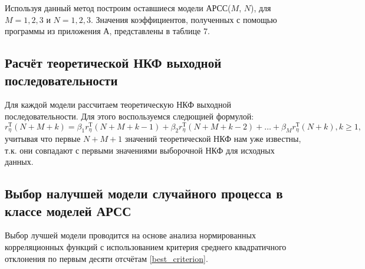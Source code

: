 \documentclass[12pt, fleqn]{article}
\begin{document}
{{{					Используя данный метод построим оставшиеся модели АРСС($M$, $N$), для $M = 1, 2, 3$ и $N = 1, 2, 3$. Значения коэффициентов, полученных с помощью программы из приложения А, представлены в таблице 7.
		}
		\subsection{Расчёт теоретической НКФ выходной последовательности} {
			Для каждой модели рассчитаем теоретическую НКФ выходной последовательности. Для этого воспользуемся следющией формулой:
			\begin{equation}
				r_\eta^\text{Т}(N + M + k) = \beta_1 r_\eta^\text{Т}(N + M + k - 1) + \beta_2 r_\eta^\text{Т}(N + M + k - 2) + \dots + \beta_M r^\text{Т}_\eta(N + k), k \geq 1,
			\end{equation}
			учитывая что первые $N + M + 1$ значений теоретической НКФ нам уже известны, т.к. они совпадают с первыми значениями выборочной НКФ для исходных данных.
		}
		\subsection{Выбор налучшей модели случайного процесса в классе моделей АРСС} {
			Выбор лучшей модели проводится на основе анализа нормированных корреляционных функций с использованием критерия среднего квадратичного отклонения по первым десяти отсчётам \eqref{best_criterion}. \medskip
					

}}}
\end{document}

